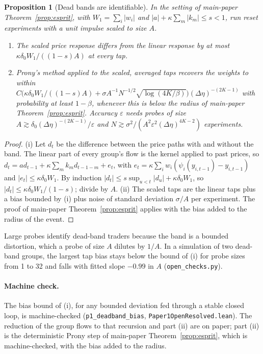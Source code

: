 \documentclass[12pt]{article}
\newtheorem{proposition}[theorem]{Proposition}
\theoremstyle{definition}
\theoremstyle{remark}
\begin{document}
\begin{proposition}[Dead bands are identifiable]\label{prop:deadband}
In the setting of main-paper Theorem~\ref{prop:esprit}, with $W_1=\sum_i|w_i|$ and $|a|+\kappa\sum_m|k_m|\le s<1$, run reset experiments with a unit impulse scaled to size $A$.
\begin{enumerate}[label=(\roman*),itemsep=1pt]
\item The scaled price response differs from the linear response by at most $\kappa\delta_0W_1/((1-s)A)$ at every tap.
\item Prony's method applied to the scaled, averaged taps recovers the weights to within $C\bigl(\kappa\delta_0W_1/((1-s)A)+\sigma A^{-1}N^{-1/2}\sqrt{\log(4K/\beta)}\bigr)(\Delta\eta)^{-(2K-1)}$ with probability at least $1-\beta$, whenever this is below the radius of main-paper Theorem~\ref{prop:esprit}. Accuracy $\varepsilon$ needs probes of size $A\gtrsim\delta_0(\Delta\eta)^{-(2K-1)}/\varepsilon$ and $N\gtrsim\sigma^2/(A^2\varepsilon^2(\Delta\eta)^{4K-2})$ experiments.
\end{enumerate}
\end{proposition}

\begin{proof}
(i) Let $d_t$ be the difference between the price paths with and without the band. The linear part of every group's flow is the kernel applied to past prices, so $d_t=ad_{t-1}+\kappa\sum_mk_md_{t-1-m}+e_t$, with $e_t=\kappa\sum_iw_i(\psi_i(y_{i,t-1})-y_{i,t-1})$ and $|e_t|\le\kappa\delta_0W_1$. By induction $|d_t|\le s\sup_{u<t}|d_u|+\kappa\delta_0W_1$, so $|d_t|\le\kappa\delta_0W_1/(1-s)$; divide by $A$. (ii) The scaled taps are the linear taps plus a bias bounded by (i) plus noise of standard deviation $\sigma/A$ per experiment. The proof of main-paper Theorem~\ref{prop:esprit} applies with the bias added to the radius of the event.
\end{proof}

Large probes identify dead-band traders because the band is a bounded distortion, which a probe of size $A$ dilutes by $1/A$. In a simulation of two dead-band groups, the largest tap bias stays below the bound of (i) for probe sizes from 1 to 32 and falls with fitted slope $-0.99$ in $A$ (\nolinkurl{open_checks.py}).

\paragraph{Machine check.} The bias bound of (i), for any bounded deviation fed through a stable closed loop, is machine-checked (\texttt{p1\_deadband\_bias}, \nolinkurl{Paper1OpenResolved.lean}). The reduction of the group flows to that recursion and part (ii) are on paper; part (ii) is the deterministic Prony step of main-paper Theorem~\ref{prop:esprit}, which is machine-checked, with the bias added to the radius.
\end{document}
